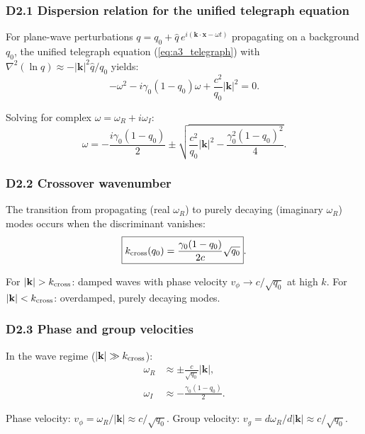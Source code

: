 \documentclass[reprint]{revtex4-2}
\begin{document}
\subsubsection{D2.1 Dispersion relation for the unified telegraph equation}

For plane-wave perturbations $q = q_0 + \hat{q}\,e^{i(\mathbf{k}\cdot\mathbf{x} - \omega t)}$ propagating on a background $q_0$, the unified telegraph equation (\ref{eq:a3_telegraph}) with $\nabla^2(\ln q) \approx -|\mathbf{k}|^2\hat{q}/q_0$ yields:
\begin{equation}
-\omega^2 - i\gamma_0(1-q_0)\omega + \frac{c^2}{q_0}|\mathbf{k}|^2 = 0.
\label{eq:full_dispersion}
\end{equation}

Solving for complex $\omega = \omega_R + i\omega_I$:
\begin{equation}
\omega = -\frac{i\gamma_0(1-q_0)}{2} \pm \sqrt{\frac{c^2}{q_0}|\mathbf{k}|^2 - \frac{\gamma_0^2(1-q_0)^2}{4}}.
\label{eq:omega_complex}
\end{equation}

\subsubsection{D2.2 Crossover wavenumber}

The transition from propagating (real $\omega_R$) to purely decaying (imaginary $\omega_R$) modes occurs when the discriminant vanishes:
\begin{equation}
\boxed{k_{\rm cross}(q_0) = \frac{\gamma_0(1-q_0)}{2c}\sqrt{q_0}}.
\label{eq:kcross_q0}
\end{equation}

For $|\mathbf{k}| > k_{\rm cross}$: damped waves with phase velocity $v_\phi \to c/\sqrt{q_0}$ at high $k$. For $|\mathbf{k}| < k_{\rm cross}$: overdamped, purely decaying modes.

\subsubsection{D2.3 Phase and group velocities}

In the wave regime ($|\mathbf{k}| \gg k_{\rm cross}$):
\begin{align}
\omega_R &\approx \pm \frac{c}{\sqrt{q_0}}|\mathbf{k}|, \\
\omega_I &\approx -\frac{\gamma_0(1-q_0)}{2}.
\end{align}

Phase velocity: $v_\phi = \omega_R/|\mathbf{k}| \approx c/\sqrt{q_0}$.
Group velocity: $v_g = d\omega_R/d|\mathbf{k}| \approx c/\sqrt{q_0}$.
\end{document}
